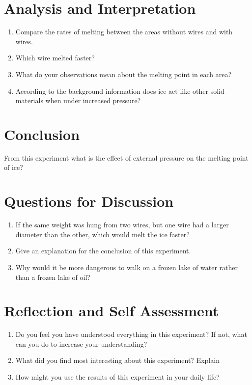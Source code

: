 \section{Analysis and Interpretation}
\begin{enumerate}
\item Compare the rates of melting between the areas without wires and with wires.
\item Which wire melted faster?
\item What do your observations mean about the melting point in each area?
\item According to the background information does ice act like other solid materials when under increased pressure? 
\end{enumerate}

\section{Conclusion}
From this experiment what is the effect of external pressure on the melting point of ice?

\section{Questions for Discussion}
\begin{enumerate}
\item If the same weight was hung from two wires, but one wire had a larger diameter than the other, which would melt the ice faster?
\item Give an explanation for the conclusion of this experiment.
\item Why would it be more dangerous to walk on a frozen lake of water rather than a frozen lake of oil? 
\end{enumerate}

\section{Reflection and Self Assessment}
\begin{enumerate}
\item Do you feel you have understood everything in this experiment? If not, what can you do to increase your understanding?
\item What did you find most interesting about this experiment? Explain
\item How might you use the results of this experiment in your daily life?
\end{enumerate}